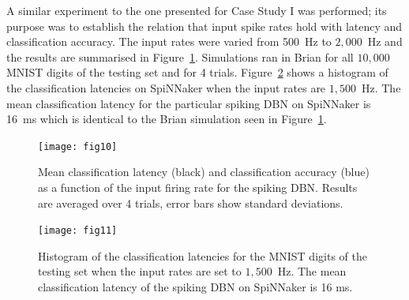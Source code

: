 \documentclass{frontiersENG} %
\begin{document}
A similar experiment to the one presented for Case Study I was performed; its purpose was to establish the relation that input spike rates hold with latency and classification accuracy.
The input rates were varied from 500~Hz to $2,000$~Hz and the results are summarised in Figure~\ref{Fig:brianLatency}. Simulations ran in Brian for all $10,000$ MNIST digits of the testing set and for 4 trials. Figure~\ref{Fig:spinnLatency1500hz} shows a histogram of the classification latencies on SpiNNaker when the input rates are $1,500$~Hz. The mean classification latency for the particular spiking DBN on SpiNNaker is 16~ms which is identical to the Brian simulation seen in Figure~\ref{Fig:brianLatency}.

\begin{figure}[hbt!]
	\centering
	\texttt{[image: fig10]}
	\caption{Mean classification latency (black) and classification accuracy (blue) as a function of the input firing rate for the spiking DBN. Results are averaged over 4 trials, error bars show standard deviations.}
	\label{Fig:brianLatency}
\end{figure} 



\begin{figure}[hbt!]
	\centering
	\texttt{[image: fig11]}
	\caption{Histogram of the classification latencies for the MNIST digits of the testing set when the input rates are set to $1,500$~Hz. The mean classification latency of the spiking DBN on SpiNNaker is 16 ms.}
	\label{Fig:spinnLatency1500hz}
\end{figure} 
\end{document}
